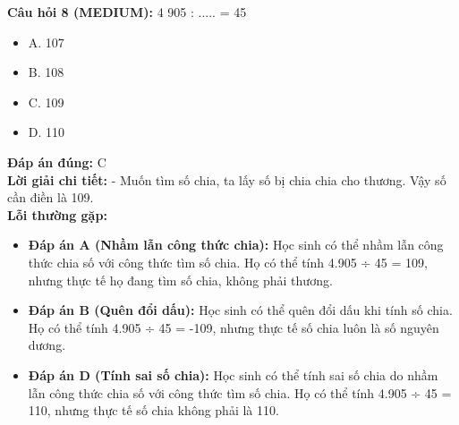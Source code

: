 \documentclass{article}
\begin{document}
\begin{minipage}{\textwidth}
\noindent\textbf{Câu hỏi 8 (MEDIUM):} 4 905 : ..... = 45 
\begin{itemize}[label={}]
    \item A. 107
    \item B. 108
    \item C. 109
    \item D. 110
\end{itemize}
\textbf{Đáp án đúng:} C \\
\textbf{Lời giải chi tiết:} - Muốn tìm số chia, ta lấy số bị chia chia cho thương. Vậy số cần điền là 109. \\
\textbf{Lỗi thường gặp:}
\begin{itemize}
  \item \textbf{Đáp án A (Nhầm lẫn công thức chia):} Học sinh có thể nhầm lẫn công thức chia số với công thức tìm số chia. Họ có thể tính 4.905 ÷ 45 = 109, nhưng thực tế họ đang tìm số chia, không phải thương.
  \item \textbf{Đáp án B (Quên đổi dấu):} Học sinh có thể quên đổi dấu khi tính số chia. Họ có thể tính 4.905 ÷ 45 = -109, nhưng thực tế số chia luôn là số nguyên dương.
  \item \textbf{Đáp án D (Tính sai số chia):} Học sinh có thể tính sai số chia do nhầm lẫn công thức chia số với công thức tìm số chia. Họ có thể tính 4.905 ÷ 45 = 110, nhưng thực tế số chia không phải là 110.
\end{itemize}
\end{minipage}
\vspace{1em}
\end{document}
